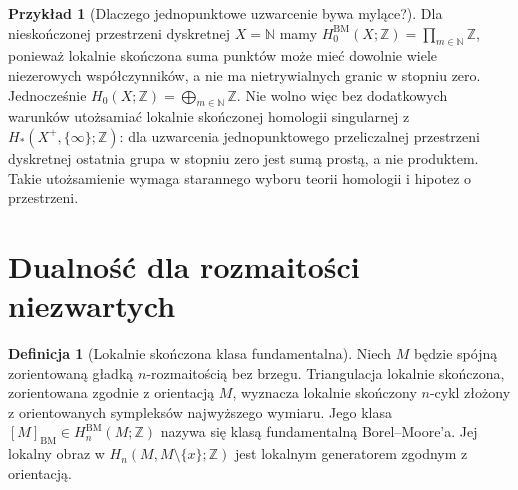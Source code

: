 \documentclass[11pt,a4paper,oneside]{report}
\newcommand{\N}{\mathbb{N}}
\newcommand{\Z}{\mathbb{Z}}
\theoremstyle{plain}
\theoremstyle{definition}
\newtheorem{definicja}[twierdzenie]{Definicja}
\newtheorem{przyklad}[twierdzenie]{Przykład}
\theoremstyle{remark}
\begin{document}
\begin{przyklad}[Dlaczego jednopunktowe uzwarcenie bywa mylące?]
Dla nieskończonej przestrzeni dyskretnej $X=\N$
mamy $H_0^{\mathrm{BM}}(X;\Z)=\prod_{m\in\N}\Z$,
ponieważ lokalnie skończona suma punktów może mieć
dowolnie wiele niezerowych współczynników, a nie
ma nietrywialnych granic w stopniu zero.
Jednocześnie $H_0(X;\Z)=\bigoplus_{m\in\N}\Z$.
Nie wolno więc bez dodatkowych warunków utożsamiać
lokalnie skończonej homologii singularnej z
$H_*(X^+,\{\infty\};\Z)$: dla uzwarcenia
jednopunktowego przeliczalnej przestrzeni dyskretnej
ostatnia grupa w stopniu zero jest sumą prostą,
a nie produktem. Takie utożsamienie wymaga starannego
wyboru teorii homologii i hipotez o przestrzeni.
\end{przyklad}

\section{Dualność dla rozmaitości niezwartych}
\begin{definicja}[Lokalnie skończona klasa fundamentalna]
Niech $M$ będzie spójną zorientowaną gładką
$n$-rozmaitością bez brzegu. Triangulacja lokalnie
skończona, zorientowana zgodnie z orientacją $M$,
wyznacza lokalnie skończony $n$-cykl złożony z
orientowanych sympleksów najwyższego wymiaru.
Jego klasa $[M]_{\mathrm{BM}}\in H_n^{\mathrm{BM}}(M;\Z)$
nazywa się klasą fundamentalną Borel--Moore'a.
Jej lokalny obraz w $H_n(M,M\setminus\{x\};\Z)$
jest lokalnym generatorem zgodnym z orientacją.
\end{definicja}
\end{document}
